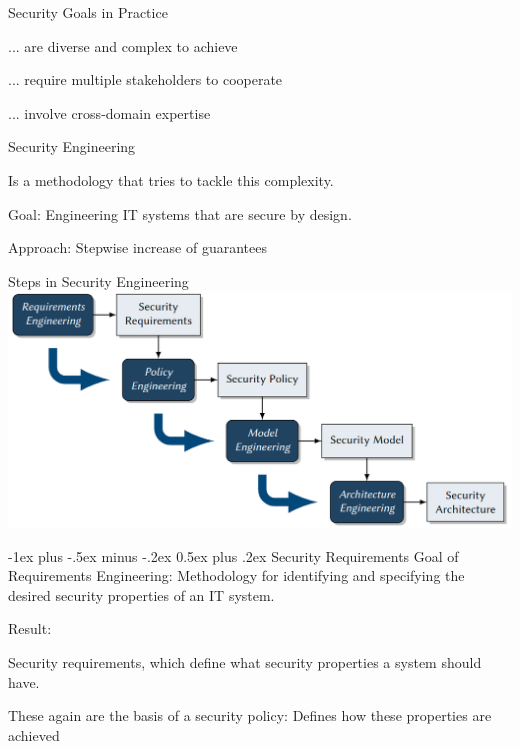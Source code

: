 \documentclass[a4paper]{article}
\makeatletter
\renewcommand{\section}{\@startsection{section}{1}{0mm}%
                {-1ex plus -.5ex minus -.2ex}%
                {0.5ex plus .2ex}%
                {\normalfont\large\bfseries}}
\makeatother
\begin{document}
\begin{multicols}{3}
    Security Goals in Practice
    \begin{itemize*}
        \item ... are diverse and complex to achieve
        \item ... require multiple stakeholders to cooperate
        \item ... involve cross-domain expertise
    \end{itemize*}

    Security Engineering
    \begin{itemize*}
        \item Is a methodology that tries to tackle this complexity.
        \item Goal: Engineering IT systems that are secure by design.
        \item Approach: Stepwise increase of guarantees
    \end{itemize*}

    Steps in Security Engineering
    \includegraphics[width=\linewidth]{Assets/Systemsicherheit-engineering-process.png}

    \section{Security Requirements}
    Goal of Requirements Engineering:
    Methodology for identifying and specifying the desired security properties of an IT system.

    Result:
    \begin{itemize*}
        \item Security requirements, which define what security properties a system should have.
        \item These again are the basis of a security policy: Defines how these properties are achieved
    \end{itemize*}


\end{multicols}
\end{document}
